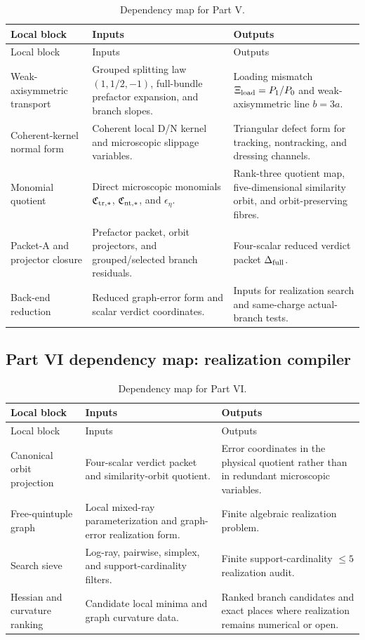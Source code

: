 \begin{longtable}{L{0.18\textwidth}L{0.29\textwidth}L{0.35\textwidth}}
\caption{Dependency map for Part V.}\label{tab:dep-part-v}\\
\toprule
Local block & Inputs & Outputs \\
\midrule
\endfirsthead
\toprule
Local block & Inputs & Outputs \\
\midrule
\endhead
Weak-axisymmetric transport & Grouped splitting law \((1,1/2,-1)\), full-bundle prefactor expansion, and branch slopes. & Loading mismatch \(\Xi_{\rm load}=P_1/P_0\) and weak-axisymmetric line \(b=3a\). \\
\addlinespace
Coherent-kernel normal form & Coherent local D/N kernel and microscopic slippage variables. & Triangular defect form for tracking, nontracking, and dressing channels. \\
\addlinespace
Monomial quotient & Direct microscopic monomials \(\mathfrak C_{{\rm tr},*}\), \(\mathfrak C_{{\rm nt},*}\), and \(\epsilon_\eta\). & Rank-three quotient map, five-dimensional similarity orbit, and orbit-preserving fibres. \\
\addlinespace
Packet-A and projector closure & Prefactor packet, orbit projectors, and grouped/selected branch residuals. & Four-scalar reduced verdict packet \(\Delta_{\rm full}\). \\
\addlinespace
Back-end reduction & Reduced graph-error form and scalar verdict coordinates. & Inputs for realization search and same-charge actual-branch tests. \\
\bottomrule
\end{longtable}

\subsection{Part VI dependency map: realization compiler}
\label{subsec:dep-part-vi}

\begin{longtable}{L{0.18\textwidth}L{0.29\textwidth}L{0.35\textwidth}}
\caption{Dependency map for Part VI.}\label{tab:dep-part-vi}\\
\toprule
Local block & Inputs & Outputs \\
\midrule
\endfirsthead
\toprule
Local block & Inputs & Outputs \\
\midrule
\endhead
Canonical orbit projection & Four-scalar verdict packet and similarity-orbit quotient. & Error coordinates in the physical quotient rather than in redundant microscopic variables. \\
\addlinespace
Free-quintuple graph & Local mixed-ray parameterization and graph-error realization form. & Finite algebraic realization problem. \\
\addlinespace
Search sieve & Log-ray, pairwise, simplex, and support-cardinality filters. & Finite support-cardinality \(\le5\) realization audit. \\
\addlinespace
Hessian and curvature ranking & Candidate local minima and graph curvature data. & Ranked branch candidates and exact places where realization remains numerical or open. \\
\bottomrule
\end{longtable}


